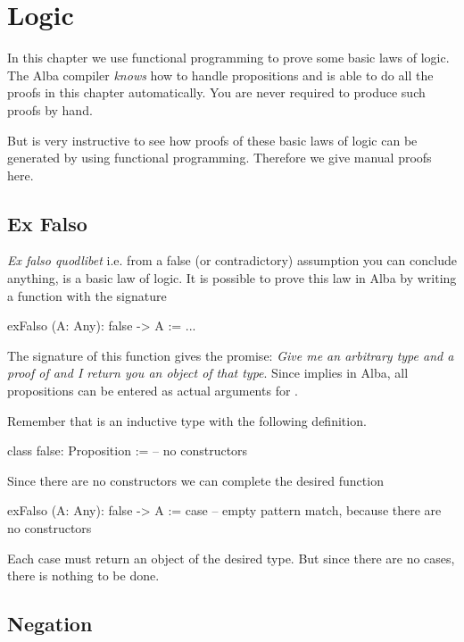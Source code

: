 \newpage
\section{Logic}
\label{sec:certprog-logic}


In this chapter we use functional programming to prove some basic laws of
logic. The Alba compiler \emph{knows} how to handle propositions and is able
to do all the proofs in this chapter automatically. You are never required to
produce such proofs by hand.

But is very instructive to see how proofs of these basic laws of logic can be
generated by using functional programming. Therefore we give manual proofs
here.



\subsection{Ex Falso}

\emph{Ex falso quodlibet} i.e. from a false (or contradictory) assumption you
can conclude anything, is a basic law of logic. It is possible to prove this
law in Alba by writing a function with the signature

\begin{alba}
    exFalso (A: Any): false -> A := ...
\end{alba}
%
The signature of this function gives the promise: \emph{Give me an arbitrary
type and a proof of  and I return you an object of that type}. Since
 implies  in Alba, all propositions can be
entered as actual arguments for .


Remember that  is an inductive type with the following definition.
\begin{alba}
    class false: Proposition := -- no constructors
\end{alba}
%
Since there are no constructors we can complete the desired function

\begin{alba}
    exFalso (A: Any): false -> A :=
        case
            -- empty pattern match, because there are no constructors
\end{alba}
%
Each case must return an object of the desired type. But since there are no
cases, there is nothing to be done.






\subsection{Negation}

